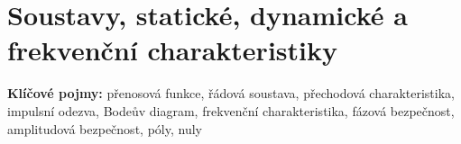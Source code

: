 \documentclass[a4paper,10pt]{article}
\begin{document}


\newpage

\section{Soustavy, statické, dynamické a frekvenční charakteristiky}

\begin{pojmybox}
\textbf{Klíčové pojmy:}
přenosová funkce, řádová soustava, přechodová charakteristika,
impulsní odezva, Bodeův diagram, frekvenční charakteristika,
fázová bezpečnost, amplitudová bezpečnost, póly, nuly
\end{pojmybox}
\end{document}
